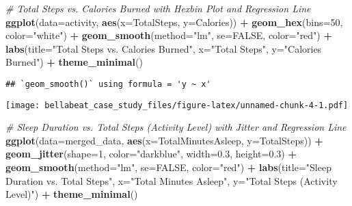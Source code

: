 \documentclass[
]{article}
\newenvironment{Shaded}{\begin{snugshade}}{\end{snugshade}}
\newcommand{\AttributeTok}[1]{\textcolor[rgb]{0.13,0.29,0.53}{#1}}
\newcommand{\CommentTok}[1]{\textcolor[rgb]{0.56,0.35,0.01}{\textit{#1}}}
\newcommand{\ConstantTok}[1]{\textcolor[rgb]{0.56,0.35,0.01}{#1}}
\newcommand{\DecValTok}[1]{\textcolor[rgb]{0.00,0.00,0.81}{#1}}
\newcommand{\FloatTok}[1]{\textcolor[rgb]{0.00,0.00,0.81}{#1}}
\newcommand{\FunctionTok}[1]{\textcolor[rgb]{0.13,0.29,0.53}{\textbf{#1}}}
\newcommand{\NormalTok}[1]{#1}
\newcommand{\SpecialCharTok}[1]{\textcolor[rgb]{0.81,0.36,0.00}{\textbf{#1}}}
\newcommand{\StringTok}[1]{\textcolor[rgb]{0.31,0.60,0.02}{#1}}
\begin{document}
\begin{Shaded}
\begin{Highlighting}[]
\CommentTok{\# Total Steps vs. Calories Burned with Hexbin Plot and Regression Line}
\FunctionTok{ggplot}\NormalTok{(}\AttributeTok{data=}\NormalTok{activity, }\FunctionTok{aes}\NormalTok{(}\AttributeTok{x=}\NormalTok{TotalSteps, }\AttributeTok{y=}\NormalTok{Calories)) }\SpecialCharTok{+} 
  \FunctionTok{geom\_hex}\NormalTok{(}\AttributeTok{bins=}\DecValTok{50}\NormalTok{, }\AttributeTok{color=}\StringTok{"white"}\NormalTok{) }\SpecialCharTok{+} 
  \FunctionTok{geom\_smooth}\NormalTok{(}\AttributeTok{method=}\StringTok{"lm"}\NormalTok{, }\AttributeTok{se=}\ConstantTok{FALSE}\NormalTok{, }\AttributeTok{color=}\StringTok{"red"}\NormalTok{) }\SpecialCharTok{+}
  \FunctionTok{labs}\NormalTok{(}\AttributeTok{title=}\StringTok{"Total Steps vs. Calories Burned"}\NormalTok{, }\AttributeTok{x=}\StringTok{"Total Steps"}\NormalTok{, }\AttributeTok{y=}\StringTok{"Calories Burned"}\NormalTok{) }\SpecialCharTok{+}
  \FunctionTok{theme\_minimal}\NormalTok{()}
\end{Highlighting}
\end{Shaded}

\begin{verbatim}
## `geom_smooth()` using formula = 'y ~ x'
\end{verbatim}

\texttt{[image: bellabeat\_case\_study\_files/figure-latex/unnamed-chunk-4-1.pdf]}

\begin{Shaded}
\begin{Highlighting}[]
\CommentTok{\# Sleep Duration vs. Total Steps (Activity Level) with Jitter and Regression Line}
\FunctionTok{ggplot}\NormalTok{(}\AttributeTok{data=}\NormalTok{merged\_data, }\FunctionTok{aes}\NormalTok{(}\AttributeTok{x=}\NormalTok{TotalMinutesAsleep, }\AttributeTok{y=}\NormalTok{TotalSteps)) }\SpecialCharTok{+} 
  \FunctionTok{geom\_jitter}\NormalTok{(}\AttributeTok{shape=}\DecValTok{1}\NormalTok{, }\AttributeTok{color=}\StringTok{"darkblue"}\NormalTok{, }\AttributeTok{width=}\FloatTok{0.3}\NormalTok{, }\AttributeTok{height=}\FloatTok{0.3}\NormalTok{) }\SpecialCharTok{+}
  \FunctionTok{geom\_smooth}\NormalTok{(}\AttributeTok{method=}\StringTok{"lm"}\NormalTok{, }\AttributeTok{se=}\ConstantTok{FALSE}\NormalTok{, }\AttributeTok{color=}\StringTok{"red"}\NormalTok{) }\SpecialCharTok{+}
  \FunctionTok{labs}\NormalTok{(}\AttributeTok{title=}\StringTok{"Sleep Duration vs. Total Steps"}\NormalTok{, }\AttributeTok{x=}\StringTok{"Total Minutes Asleep"}\NormalTok{, }\AttributeTok{y=}\StringTok{"Total Steps (Activity Level)"}\NormalTok{) }\SpecialCharTok{+}
  \FunctionTok{theme\_minimal}\NormalTok{()}
\end{Highlighting}
\end{Shaded}
\end{document}
